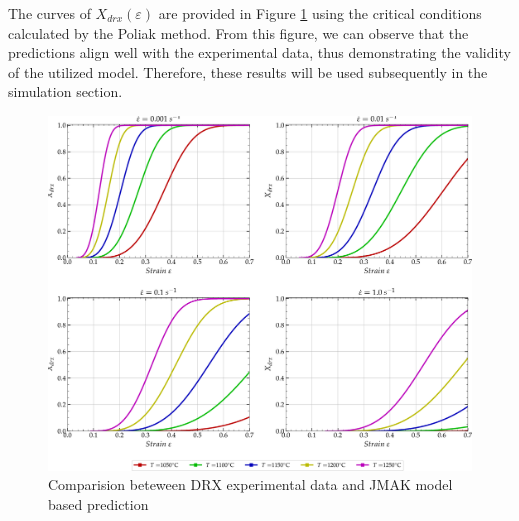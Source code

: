 \documentclass[metals,article,submit,pdftex,moreauthors]{Definitions/mdpi}
\DeclareRobustCommand{\mdot}[1]{\accentset{\mbox{\bfseries .}}{#1}}
\DeclareRobustCommand{\RMSE}{\text{E}_\text{RMS}}
\DeclareRobustCommand{\MARE}{\text{E}_\text{MAR}}
\DeclareRobustCommand{\MPa}{\text{MPa}}
\begin{document}
The curves of $X_{drx}(\varepsilon)$ are provided in Figure \ref{fig:nDRX} using the critical conditions calculated by the Poliak method.
From this figure, we can observe that the predictions align well with the experimental data, thus demonstrating the validity of the utilized model.
Therefore, these results will be used subsequently in the simulation section.
\begin{figure}[H]
\centering
\includegraphics[width=0.99\columnwidth]{Figures/nDRX}
\caption{Comparision beteween DRX experimental data and JMAK model based prediction}
\label{fig:nDRX}
\end{figure}

\end{document}
